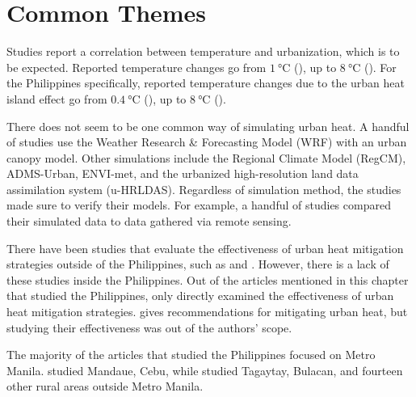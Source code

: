 \section{Common Themes}
	Studies report a correlation between temperature and urbanization, which is to be expected.
	Reported temperature changes go from $\qty{1}{\degreeCelsius}$ (\cite{Huszar2018a}), 
		up to $\qty{8}{\degreeCelsius}$ (\cite{Wang2019}).
	For the Philippines specifically, reported temperature changes due to the urban heat island effect go from $\qty{0.4}{\degreeCelsius}$ (\cite{Oliveros2019}),
		up to $\qty{8}{\degreeCelsius}$ (\cite{Bilang2022}).
	
	There does not seem to be one common way of simulating urban heat.
	A handful of studies use the Weather Research \& Forecasting Model (WRF) with an urban canopy model.
	Other simulations include the Regional Climate Model (RegCM),
		ADMS-Urban, 
		ENVI-met, and
		the urbanized high-resolution land data assimilation system (u-HRLDAS).
	Regardless of simulation method, the studies made sure to verify their models. For example, a handful of studies compared their simulated data to data gathered via remote sensing.
	
	There have been studies that evaluate the effectiveness of urban heat mitigation strategies outside of the Philippines, such as \textcite{Gao2019} and \textcite{Gao2020}. 
	However, there is a lack of these studies inside the Philippines.
	Out of the articles mentioned in this chapter that studied the Philippines, only \textcite{Cortes2022} directly examined the effectiveness of urban heat mitigation strategies.
	\textcite{Purio2022} gives recommendations for mitigating urban heat, but studying their effectiveness was out of the authors' scope.
	
	The majority of the articles that studied the Philippines focused on Metro Manila.
	\textcite{Cortes2022} studied Mandaue, Cebu, while \textcite{Oliveros2019} studied Tagaytay, Bulacan, and fourteen other rural areas outside Metro Manila.
	
		
